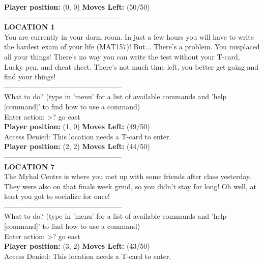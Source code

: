 \documentclass[11pt]{article}
\begin{document}
\noindent
\begin{mdframed}
\textbf{Player position:} (0, 0)           \textbf{Moves Left:} (50/50)\\
--------------------------------------------------\\
\textbf{LOCATION 1}\\
You are currently in your dorm room. In just a few hours you will have to write the hardest exam of your life (MAT157)! But... There's a problem. You misplaced all your things! There's no way you can write the test without your T-card, Lucky pen, and cheat sheet. There's not much time left, you better get going and find your things!\\
--------------------------------------------------\\
What to do? (type in 'menu' for a list of available commands and 'help [command]' to find how to use a command)\\
Enter action: >? go east\\
\textbf{Player position:} (1, 0)           \textbf{Moves Left:} (49/50)\\
Access Denied: This location needs a T-card to enter.\\

\textbf{Player position:} (2, 2)           \textbf{Moves Left:} (44/50)\\
--------------------------------------------------\\
\textbf{LOCATION 7}\\
The Myhal Centre is where you met up with some friends after class yesterday. They were also on that finals week grind, so you didn't stay for long! Oh well, at least you got to socialize for once!\\
--------------------------------------------------\\
What to do? (type in 'menu' for a list of available commands and 'help [command]' to find how to use a command)\\
Enter action: >? go east\\
\textbf{Player position:} (3, 2)           \textbf{Moves Left:} (43/50)\\
Access Denied: This location needs a T-card to enter.
\end{mdframed}
\end{document}

